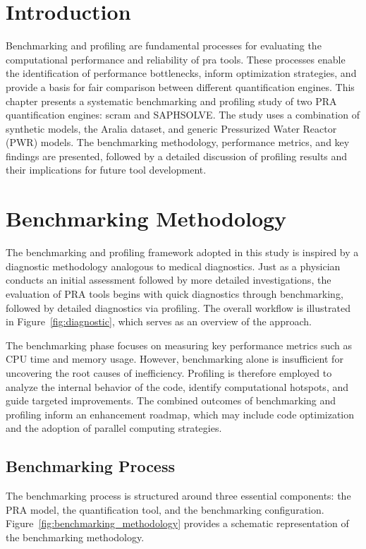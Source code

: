 \section{Introduction}
Benchmarking and profiling are fundamental processes for evaluating the computational performance and reliability of \acrshort{pra} tools. These processes enable the identification of performance bottlenecks, inform optimization strategies, and provide a basis for fair comparison between different quantification engines. This chapter presents a systematic benchmarking and profiling study of two PRA quantification engines: scram and SAPHSOLVE. The study uses a combination of synthetic models, the Aralia dataset, and generic Pressurized Water Reactor (PWR) models. The benchmarking methodology, performance metrics, and key findings are presented, followed by a detailed discussion of profiling results and their implications for future tool development.

\section{Benchmarking Methodology}
The benchmarking and profiling framework adopted in this study is inspired by a diagnostic methodology analogous to medical diagnostics. Just as a physician conducts an initial assessment followed by more detailed investigations, the evaluation of PRA tools begins with quick diagnostics through benchmarking, followed by detailed diagnostics via profiling. The overall workflow is illustrated in Figure~\ref{fig:diagnostic}, which serves as an overview of the approach.



The benchmarking phase focuses on measuring key performance metrics such as CPU time and memory usage. However, benchmarking alone is insufficient for uncovering the root causes of inefficiency. Profiling is therefore employed to analyze the internal behavior of the code, identify computational hotspots, and guide targeted improvements. The combined outcomes of benchmarking and profiling inform an enhancement roadmap, which may include code optimization and the adoption of parallel computing strategies.

\subsection{Benchmarking Process}
The benchmarking process is structured around three essential components: the PRA model, the quantification tool, and the benchmarking configuration. Figure~\ref{fig:benchmarking_methodology} provides a schematic representation of the benchmarking methodology.

